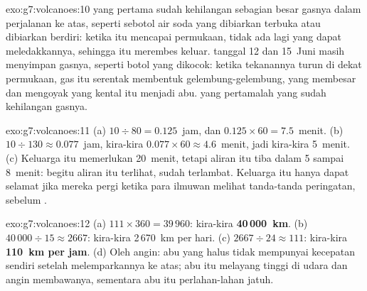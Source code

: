 \begin{solution}{exo:g7:volcanoes:10}
 yang pertama sudah kehilangan sebagian besar gasnya dalam
perjalanan ke atas, seperti sebotol air soda yang dibiarkan terbuka atau
dibiarkan berdiri: ketika  itu mencapai permukaan, tidak ada lagi
yang dapat meledakkannya, sehingga  itu merembes keluar.  tanggal
12 dan 15~Juni masih menyimpan gasnya, seperti botol yang dikocok: ketika
tekanannya turun di dekat permukaan, gas itu serentak membentuk
gelembung-gelembung, yang membesar dan mengoyak  yang kental itu
menjadi abu.  yang pertamalah yang sudah kehilangan gasnya.
\end{solution}

\begin{solution}{exo:g7:volcanoes:11}
(a) $10 \div 80 = 0.125$~jam, dan $0.125 \times 60 = 7.5$~menit. (b)
$10 \div 130 \approx 0.077$~jam, kira-kira $0.077 \times 60 \approx
4.6$~menit, jadi kira-kira 5~menit. (c) Keluarga itu memerlukan 20~menit,
tetapi aliran itu tiba dalam 5 sampai 8~menit: begitu aliran itu terlihat,
sudah terlambat. Keluarga itu hanya dapat selamat jika mereka pergi ketika
para ilmuwan melihat tanda-tanda peringatan, sebelum .
\end{solution}

\begin{solution}{exo:g7:volcanoes:12}
(a) $111 \times 360 = 39\,960$: kira-kira \textbf{40\,000~km}. (b)
$40\,000 \div 15 \approx 2667$: kira-kira 2\,670~km per hari. (c)
$2667 \div 24 \approx 111$: kira-kira \textbf{110~km per jam}. (d) Oleh
angin: abu yang halus tidak mempunyai kecepatan sendiri setelah 
melemparkannya ke atas; abu itu melayang tinggi di udara dan angin
membawanya, sementara abu itu perlahan-lahan jatuh.
\end{solution}

